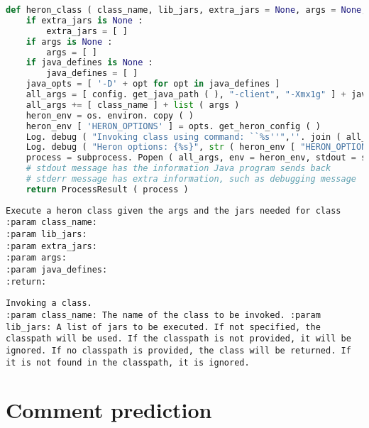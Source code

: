     \begin{lstlisting}[language=Python, caption={Input code}]
def heron_class ( class_name, lib_jars, extra_jars = None, args = None, java_defines = None ) : 
    if extra_jars is None : 
        extra_jars = [ ] 
    if args is None : 
        args = [ ] 
    if java_defines is None : 
        java_defines = [ ] 
    java_opts = [ '-D' + opt for opt in java_defines ] 
    all_args = [ config. get_java_path ( ), "-client", "-Xmx1g" ] + java_opts + [ "-cp", config. get_classpath ( extra_jars + lib_jars ) ] 
    all_args += [ class_name ] + list ( args ) 
    heron_env = os. environ. copy ( ) 
    heron_env [ 'HERON_OPTIONS' ] = opts. get_heron_config ( ) 
    Log. debug ( "Invoking class using command: ``%s''",''. join ( all_args ) ) 
    Log. debug ( "Heron options: {%s}", str ( heron_env [ "HERON_OPTIONS" ] ) ) 
    process = subprocess. Popen ( all_args, env = heron_env, stdout = subprocess. PIPE, stderr = subprocess. PIPE, bufsize = 1 ) 
    # stdout message has the information Java program sends back 
    # stderr message has extra information, such as debugging message 
    return ProcessResult ( process ) 
    \end{lstlisting}
    \begin{lstlisting}[caption={Label}]
Execute a heron class given the args and the jars needed for class 
:param class_name:
:param lib_jars:
:param extra_jars:
:param args:
:param java_defines:
:return:
    \end{lstlisting}
    \begin{lstlisting}[caption={Prediction}]
Invoking a class.
:param class_name: The name of the class to be invoked. :param lib_jars: A list of jars to be executed. If not specified, the classpath will be used. If the classpath is not provided, it will be ignored. If no classpath is provided, the class will be returned. If it is not found in the classpath, it is ignored.
    \end{lstlisting}

\section{Comment prediction}
\label{comment_pred}
